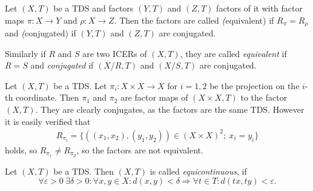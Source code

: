 \begin{definition}
	Let $(X, T)$ be a TDS and factors $(Y, T)$ and $(Z, T)$ factors of it with factor maps $\pi: X \to Y$ and $\rho: X \to Z$.	Then the factors are called \emph(equivalent) if $R_\pi = R_\rho$ and \emph(conjugated) if $(Y, T)$ and $(Z, T)$ are conjugated.
	
	Similarly if $R$ and $S$ are two ICERs of $(X, T)$, they are called \emph{equivalent} if $R = S$ and \emph{conjugated} if $(X/R, T)$ and $(X/S, T)$ are conjugated.
\end{definition}

\begin{example}
	Let $(X, T)$ be a TDS. Let $\pi_i: X \times X \to X$ for $i = 1, 2$ be the projection on the $i$-th coordinate. Then $\pi_1$ and $\pi_2$ are factor maps of $(X \times X, T)$ to the factor $(X, T)$. They are clearly conjugates, as the factors are the same TDS. However it is easily verified that
	\begin{align*}
		R_{\pi_i} = \{((x_1, x_2), (y_1, y_2)) \in (X \times X)^2;\ x_i = y_i\}
	\end{align*}
	holds, so $R_{\pi_1} \neq R_{\pi_2}$, so the factors are not equivalent.
\end{example}

\begin{definition}
	Let $(X,T)$ be a TDS. Then $(X,T)$ is called \emph{equicontinuous}, if
	\begin{equation*}
		\forall \varepsilon > 0\ \exists \delta > 0: \forall x , y \in X :  d(x, y) < \delta  \Rightarrow \forall t \in T: d(tx, ty) < \varepsilon.
	\end{equation*}
\end{definition}

